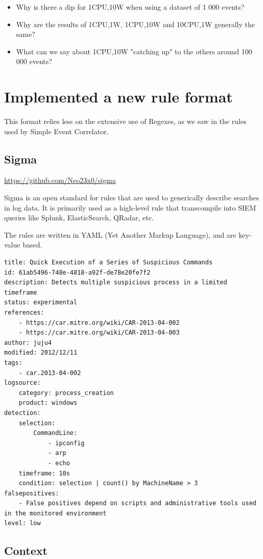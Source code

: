 \begin{itemize}
\item Why is there a dip for 1CPU,10W when using a dataset of 1 000 events?
\item Why are the results of 1CPU,1W, 1CPU,10W and 10CPU,1W generally the same?
\item What can we say about 1CPU,10W "catching up" to the others around 100 000 events?
\end{itemize}

\section{Implemented a new rule format}
This format relies less on the extensive use of Regexes, as we saw in the rules used by Simple Event Correlator.

\subsection{Sigma}
\url{https://github.com/Neo23x0/sigma}

Sigma is an open standard for rules that are used to generically describe searches in log data. It is primarily used as a high-level rule that transcompile into SIEM queries like Splunk, ElasticSearch, QRadar, etc.

The rules are written in YAML (Yet Another Markup Language), and are key-value based.

\begin{lstlisting}
title: Quick Execution of a Series of Suspicious Commands
id: 61ab5496-748e-4818-a92f-de78e20fe7f2
description: Detects multiple suspicious process in a limited timeframe
status: experimental
references:
    - https://car.mitre.org/wiki/CAR-2013-04-002
    - https://car.mitre.org/wiki/CAR-2013-04-003
author: juju4
modified: 2012/12/11
tags:
    - car.2013-04-002
logsource:
    category: process_creation
    product: windows
detection:
    selection:
        CommandLine:
            - ipconfig
            - arp
            - echo
    timeframe: 10s
    condition: selection | count() by MachineName > 3
falsepositives:
    - False positives depend on scripts and administrative tools used in the monitored environment
level: low
\end{lstlisting}

\subsection{Context}

